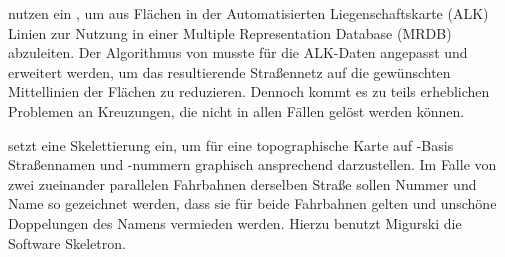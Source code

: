 \documentclass[../main/thesis.tex]{subfiles}
\begin{document}


 nutzen ein , um aus Flächen in der Automatisierten Liegenschaftskarte (ALK) Linien zur Nutzung in einer Multiple Representation Database (MRDB) abzuleiten.
Der Algorithmus von \citeauthor{EE99}  musste für die ALK-Daten angepasst und erweitert werden, um das resultierende Straßennetz auf die gewünschten Mittellinien der Flächen zu reduzieren.
Dennoch kommt es zu teils erheblichen Problemen an Kreuzungen, die nicht in allen Fällen gelöst werden können. 


 setzt eine Skelettierung ein, um für eine topographische Karte auf \osm-Basis Straßennamen und -nummern graphisch ansprechend darzustellen.
Im Falle von zwei zueinander parallelen Fahrbahnen derselben Straße sollen Nummer und Name so gezeichnet werden, dass sie für beide Fahrbahnen gelten und unschöne Doppelungen des Namens vermieden werden.
Hierzu benutzt Migurski die Software Skeletron. \citetext{\citealp{ME11}, cf. \citealp{Mig12}}
\end{document}
